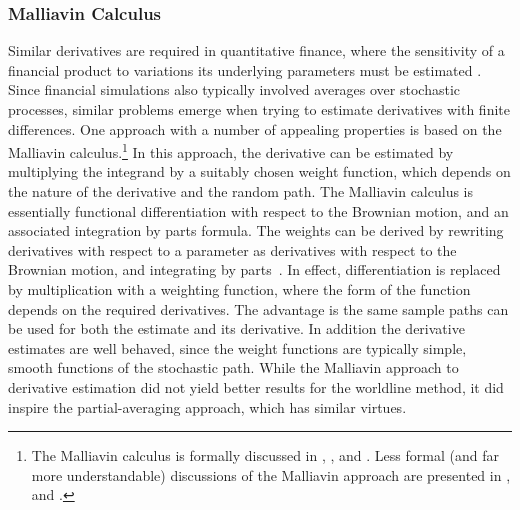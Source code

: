 \subsubsection{Malliavin Calculus}
Similar derivatives are required in quantitative finance, where the sensitivity of a financial 
product to variations its underlying parameters must be estimated \citep{Glasserman2004}.  
Since financial simulations also typically involved averages over stochastic processes, similar problems emerge
when trying to estimate derivatives with finite differences.
One approach with a number of appealing properties is based on the Malliavin calculus.\footnote{
The Malliavin calculus is formally discussed in \citet{Nualart2006}, \citet{Malliavin2006}, and \cite{DiNunno2009}.
Less formal (and far more understandable) discussions of the Malliavin approach are presented in 
\citet{Chen2007}, and \citet{Kohatsu-Higa2003,Kohatsu-Higa2004}.}
In this approach, the derivative can be estimated by multiplying the integrand by
a suitably chosen weight function, which depends on the nature of the derivative and the random path.
The Malliavin calculus is essentially functional differentiation with respect to the Brownian motion, 
and an associated integration by parts formula.   
The weights can be derived by rewriting derivatives with respect to a parameter as
derivatives with respect to the Brownian motion, and integrating by parts~\citep{Kohatsu-Higa2004}.  
In effect, differentiation is replaced by multiplication with a weighting function,
 where the form of the function depends on the required derivatives.
The advantage is the same sample paths can be used for both the estimate and its derivative.  In addition
the derivative estimates are well behaved, since the weight functions are typically simple, smooth functions
of the stochastic path.   
While the Malliavin approach to derivative estimation did not yield better results for the worldline
method, it did inspire the partial-averaging approach, which has similar virtues.  

